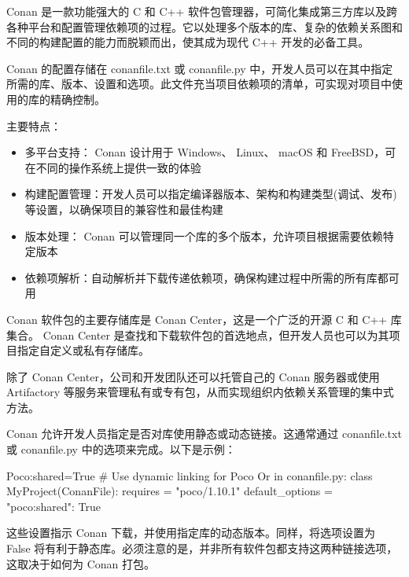Conan 是一款功能强大的 C 和 C++ 软件包管理器，可简化集成第三方库以及跨各种平台和配置管理依赖项的过程。它以处理多个版本的库、复杂的依赖关系图和不同的构建配置的能力而脱颖而出，使其成为现代 C++ 开发的必备工具。


Conan 的配置存储在 conanfile.txt 或 conanfile.py 中，开发人员可以在其中指定所需的库、版本、设置和选项。此文件充当项目依赖项的清单，可实现对项目中使用的库的精确控制。

主要特点：

\begin{itemize}
\item
多平台支持： Conan 设计用于 Windows、 Linux、 macOS 和 FreeBSD，可在不同的操作系统上提供一致的体验

\item
构建配置管理：开发人员可以指定编译器版本、架构和构建类型(调试、发布)等设置，以确保项目的兼容性和最佳构建

\item
版本处理： Conan 可以管理同一个库的多个版本，允许项目根据需要依赖特定版本

\item
依赖项解析：自动解析并下载传递依赖项，确保构建过程中所需的所有库都可用
\end{itemize}


Conan 软件包的主要存储库是 Conan Center，这是一个广泛的开源 C 和 C++ 库集合。 Conan Center 是查找和下载软件包的首选地点，但开发人员也可以为其项目指定自定义或私有存储库。

除了 Conan Center，公司和开发团队还可以托管自己的 Conan 服务器或使用 Artifactory 等服务来管理私有或专有包，从而实现组织内依赖关系管理的集中式方法。


Conan 允许开发人员指定是否对库使用静态或动态链接。这通常通过 conanfile.txt 或 conanfile.py 中的选项来完成。以下是示例：

\begin{shell}
[options]
Poco:shared=True # Use dynamic linking for Poco
Or in conanfile.py:
class MyProject(ConanFile):
    requires = "poco/1.10.1"
    default_options = {"poco:shared": True}
\end{shell}

这些设置指示 Conan 下载，并使用指定库的动态版本。同样，将选项设置为 False 将有利于静态库。必须注意的是，并非所有软件包都支持这两种链接选项，这取决于如何为 Conan 打包。

